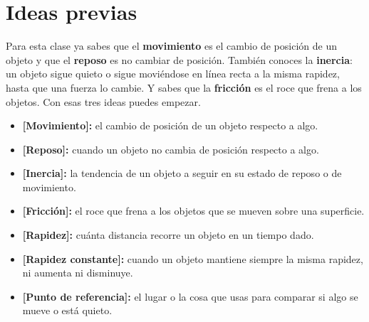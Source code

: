 \documentclass[
  spanish,
  letterpaper,
  12pt,
  oneside,
  open=any,
  DIV=15]{scrbook}
\providecommand{\tightlist}{%
  \setlength{\itemsep}{0pt}\setlength{\parskip}{0pt}}
\newcommand{\setcolorsection}[2]{%
  \definecolor{currentsectionbg}{HTML}{#1}%
  \definecolor{currentsectionborder}{HTML}{#2}%
}
\begin{document}
\setcolorsection{f9ebaf}{e8d68a}

\section{Ideas previas}\label{ideas-previas-6}

\begin{tcolorbox}[enhanced jigsaw, arc=.35mm, bottomrule=.15mm, bottomtitle=1mm, breakable, colback=white, colbacktitle=quarto-callout-important-color!10!white, colframe=quarto-callout-important-color-frame, coltitle=black, left=2mm, leftrule=.75mm, opacityback=0, opacitybacktitle=0.6, rightrule=.15mm, title=\textcolor{quarto-callout-important-color}{\faExclamation}\hspace{0.5em}{Anclaje Cognitivo (Prerrequisitos)}, titlerule=0mm, toprule=.15mm, toptitle=1mm]

Para esta clase ya sabes que el \textbf{movimiento} es el cambio de
posición de un objeto y que el \textbf{reposo} es no cambiar de
posición. También conoces la \textbf{inercia}: un objeto sigue quieto o
sigue moviéndose en línea recta a la misma rapidez, hasta que una fuerza
lo cambie. Y sabes que la \textbf{fricción} es el roce que frena a los
objetos. Con esas tres ideas puedes empezar.

\end{tcolorbox}

\begin{tcolorbox}[enhanced jigsaw, arc=.35mm, bottomrule=.15mm, bottomtitle=1mm, breakable, colback=white, colbacktitle=quarto-callout-tip-color!10!white, colframe=quarto-callout-tip-color-frame, coltitle=black, left=2mm, leftrule=.75mm, opacityback=0, opacitybacktitle=0.6, rightrule=.15mm, title=\textcolor{quarto-callout-tip-color}{\faLightbulb}\hspace{0.5em}{Apoyo Procedimental (Vocabulario Clave)}, titlerule=0mm, toprule=.15mm, toptitle=1mm]

\begin{itemize}
\tightlist
\item
  \textbf{{[}Movimiento{]}:} el cambio de posición de un objeto respecto
  a algo.
\item
  \textbf{{[}Reposo{]}:} cuando un objeto no cambia de posición respecto
  a algo.
\item
  \textbf{{[}Inercia{]}:} la tendencia de un objeto a seguir en su
  estado de reposo o de movimiento.
\item
  \textbf{{[}Fricción{]}:} el roce que frena a los objetos que se mueven
  sobre una superficie.
\item
  \textbf{{[}Rapidez{]}:} cuánta distancia recorre un objeto en un
  tiempo dado.
\item
  \textbf{{[}Rapidez constante{]}:} cuando un objeto mantiene siempre la
  misma rapidez, ni aumenta ni disminuye.
\item
  \textbf{{[}Punto de referencia{]}:} el lugar o la cosa que usas para
  comparar si algo se mueve o está quieto.
\end{itemize}

\end{tcolorbox}
\end{document}
